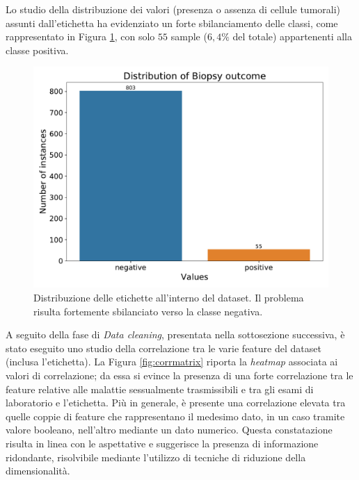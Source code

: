 Lo studio della distribuzione dei valori (presenza o assenza di cellule tumorali) assunti dall'etichetta ha evidenziato un forte sbilanciamento delle classi, come rappresentato in Figura \ref{fig:biopsydistribution}, con solo $55$ sample ($6,4\%$ del totale) appartenenti alla classe positiva.
\begin{figure}
	\centering
	\includegraphics[width=1\linewidth]{images/biopsy_distribution}
	\caption{Distribuzione delle etichette all'interno del dataset. Il problema risulta fortemente sbilanciato verso la classe negativa.}
	\label{fig:biopsydistribution}
\end{figure}
A seguito della fase di \textit{Data cleaning}, presentata nella sottosezione successiva, è stato eseguito uno studio della correlazione tra le varie feature del dataset (inclusa l'etichetta). La Figura \ref{fig:corrmatrix} riporta la \textit{heatmap} associata ai valori di correlazione; da essa si evince la presenza di una forte correlazione tra le feature relative alle malattie sessualmente trasmissibili e tra gli esami di laboratorio e l'etichetta. Più in generale, è presente una correlazione elevata tra quelle coppie di feature che rappresentano il medesimo dato, in un caso tramite valore booleano, nell'altro mediante un dato numerico. Questa constatazione risulta in linea con le aspettative e suggerisce la presenza di informazione ridondante, risolvibile mediante l'utilizzo di tecniche di riduzione della dimensionalità.
